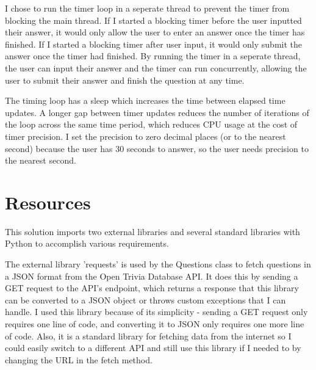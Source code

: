 \documentclass[12pt]{article}
\begin{document}
I chose to run the timer loop in a seperate thread to prevent the timer from blocking the main thread. If I started a blocking timer before the user inputted their answer, it would only allow the user to enter an answer once the timer has finished. If I started a blocking timer after user input, it would only submit the answer once the timer had finished. By running the timer in a seperate thread, the user can input their answer and the timer can run concurrently, allowing the user to submit their answer and finish the question at any time. 

The timing loop has a sleep which increases the time between elapsed time updates. A longer gap between timer updates reduces the number of iterations of the loop across the same time period, which reduces CPU usage at the cost of timer precision. I set the precision to zero decimal places (or to the nearest second) because the user has 30 seconds to answer, so the user needs precision to the nearest second.

\section{Resources}


This solution imports two external libraries and several standard libraries with Python to accomplish various requirements.

The external library 'requests' is used by the Questions class to fetch questions in a JSON format from the Open Trivia Database API. It does this by sending a GET request to the API's endpoint, which returns a response that this library can be converted to a JSON object or throws custom exceptions that I can handle. I used this library because of its simplicity - sending a GET request only requires one line of code, and converting it to JSON only requires one more line of code. Also, it is a standard library for fetching data from the internet so I could easily switch to a different API and still use this library if I needed to by changing the URL in the fetch method.
\end{document}
